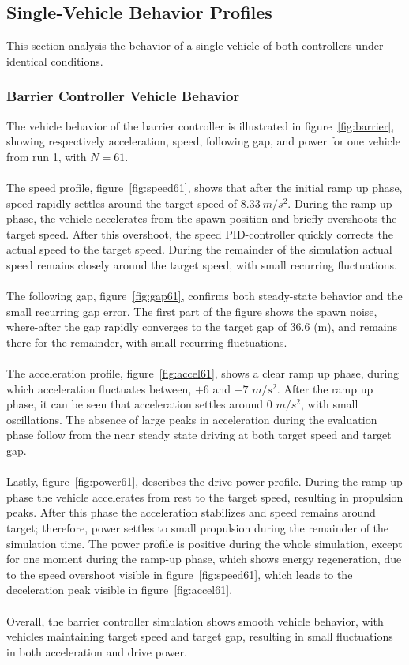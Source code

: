 \subsection{Single-Vehicle Behavior Profiles}
 This section analysis the behavior of a single vehicle of both controllers under identical conditions. 

\subsubsection{Barrier Controller Vehicle Behavior}
The vehicle behavior of the barrier controller is illustrated in figure~\ref{fig:barrier}, showing respectively acceleration, speed, following gap, and power for one vehicle from run 1, with \(N=61\). \\\\
The speed profile, figure~\ref{fig:speed61}, shows that after the initial ramp up phase, speed rapidly settles around the target speed of $8.33 \ m/s^2$. During the ramp up phase, the vehicle accelerates from the spawn position and briefly overshoots the target speed. After this overshoot, the speed PID-controller quickly corrects the actual speed to the target speed. During the remainder of the simulation actual speed remains closely around the target speed, with small recurring fluctuations. 
\\\\
The following gap, figure~\ref{fig:gap61}, confirms both steady-state behavior and the small recurring gap error. The first part of the figure shows the spawn noise, where-after the gap rapidly converges to the target gap of 36.6 (m), and remains there for the remainder, with small recurring fluctuations.  
\\\\
The acceleration profile, figure~\ref{fig:accel61}, shows a clear ramp up phase, during which acceleration fluctuates between, $+6$ and $-7$ \(m/s^2\). After the ramp up phase, it can be seen that acceleration settles around 0 \(m/s^2\), with small oscillations. The absence of large peaks in acceleration during the evaluation phase follow from the near steady state driving at both target speed and target gap.  
\\\\
Lastly, figure~\ref{fig:power61}, describes the drive power profile. During the ramp-up phase the vehicle accelerates from rest to the target speed, resulting in propulsion peaks. After this phase the acceleration stabilizes and speed remains around target; therefore, power settles to small propulsion during the remainder of the simulation time. The power profile is positive during the whole simulation, except for one moment during the ramp-up phase, which shows energy regeneration, due to the speed overshoot visible in figure~\ref{fig:speed61}, which leads to the deceleration peak visible in figure~\ref{fig:accel61}.
\\\\
Overall, the barrier controller simulation shows smooth vehicle behavior, with vehicles maintaining target speed and target gap, resulting in small fluctuations in both acceleration and drive power.   



